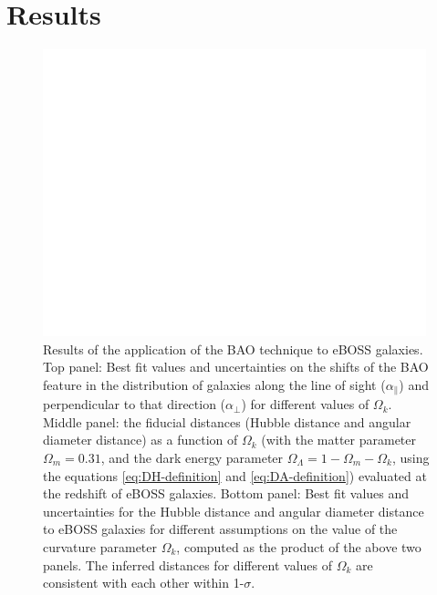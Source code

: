 \chapter{Results}
\label{cha:results}


\begin{figure}[b]
	\centering
	\includegraphics[width=0.99\textwidth]{../figs/phase2_DA_DH_flat.pdf}
%
	\caption[Derivation of cosmological distance measurements.]{Results of the application of the BAO technique to eBOSS galaxies. Top panel: Best fit values and uncertainties on the shifts of the BAO feature in the distribution of galaxies along the line of sight ($\alpha_\parallel$) and perpendicular to that direction ($\alpha_\perp$) for different values of $\Omega_k$. Middle panel: the fiducial distances (Hubble distance and angular diameter distance) as a function of $\Omega_k$ (with the matter parameter $\Omega_m = 0.31$, and the dark energy parameter $\Omega_\Lambda=1 - \Omega_m - \Omega_k$, using the equations \eqref{eq:DH-definition} and \eqref{eq:DA-definition}) evaluated at the redshift of eBOSS galaxies. Bottom panel: Best fit values and uncertainties for the Hubble distance and angular diameter distance to eBOSS galaxies for different assumptions on the value of the curvature parameter $\Omega_k$, computed as the product of the above two panels. The inferred distances for different values of $\Omega_k$ are consistent with each other within 1-$\sigma$.}
	\label{fig:DA_DH}
\end{figure}

